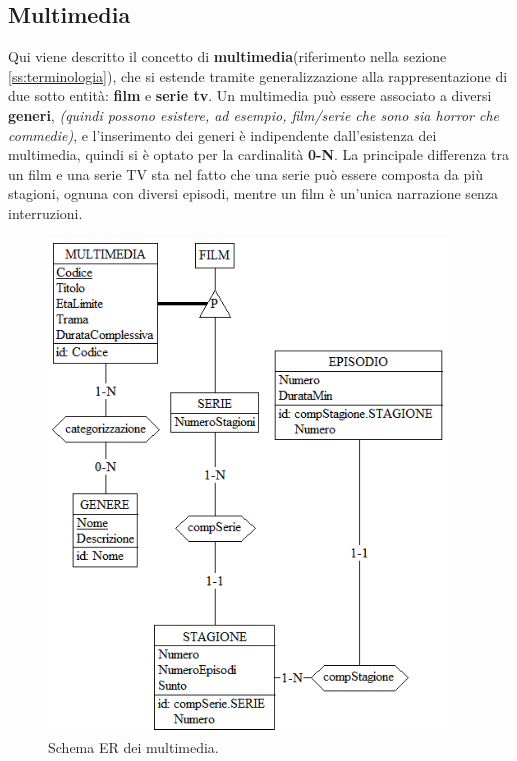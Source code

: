 \documentclass[a4paper,12pt]{report}
\begin{document}
	\subsection{Multimedia}
	Qui viene descritto il concetto di \textbf{multimedia}(riferimento nella sezione \ref{ss:terminologia}), che si estende tramite generalizzazione alla rappresentazione di due sotto entità: \textbf{film} e \textbf{serie tv}. Un multimedia può essere associato a diversi \textbf{generi}, \textit{(quindi possono esistere, ad esempio, film/serie che sono sia horror che commedie)}, e l'inserimento dei generi è indipendente dall'esistenza dei multimedia, quindi si è optato per la cardinalità \textbf{0-N}. La principale differenza tra un film e una serie TV sta nel fatto che una serie può essere composta da più stagioni, ognuna con diversi episodi, mentre un film è un'unica narrazione senza interruzioni.
	\begin{figure}[H]
		\centering
		\includegraphics[width=300pt]{ER/multimedia.png}
		\caption{Schema ER dei multimedia.}
	\end{figure}
\end{document}
